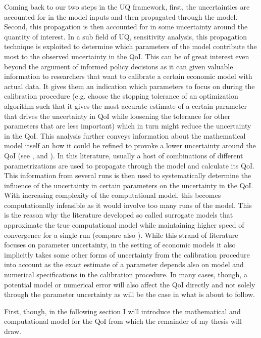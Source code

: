Coming back to our two steps in the UQ framework, first, the uncertainties are accounted for in the model inputs and then propagated through the model. Second, this propagation is then accounted for in some uncertainty around the quantity of interest. In a sub field of UQ, sensitivity analysis, this propagation technique is exploited to determine which parameters of the model contribute the most to the observed uncertainty in the QoI. This can be of great interest even beyond the argument of informed policy decisions as it can given valuable information to researchers that want to calibrate a certain economic model with actual data. It gives them an indication which parameters to focus on during the calibration procedure (e.g. choose the stopping tolerance of an optimization algorithm such that it gives the most accurate estimate of a certain parameter that drives the uncertainty in QoI while loosening the tolerance for other parameters that are less important) which in turn might reduce the uncertainty in the QoI. This analysis further conveys information about the mathematical model itself an how it could be refined to provoke a lower uncertainty around the QoI (see \cite{Scheidegger.2019},  \cite{Harenberg.2019} and \cite{Ghanem.2017}). In this literature, usually a host of combinations of different parametrizations are used to propagate through the model and calculate its QoI. This information from several runs is then used to systematically determine the influence of the uncertainty in certain parameters on the uncertainty in the QoI. With increasing complexity of the computational model, this becomes computationally infeasible as it would involve too many runs of the model. This is the reason why the literature developed so called surrogate models that approximate the true computational model while maintaining higher speed of convergence for a single run (compare also \cite{Saltelli.2008}). While this strand of literature focuses on parameter uncertainty, in the setting of economic models it also implicitly takes some other forms of uncertainty from the calibration procedure into account as the exact estimate of a parameter depends also on model and numerical specifications in the calibration procedure. In many cases, though, a potential model or numerical error will also affect the QoI directly and not solely through the parameter uncertainty as will be the case in what is about to follow.

First, though, in the following section I will introduce the mathematical and computational model for the QoI from which the remainder of my thesis will draw.

